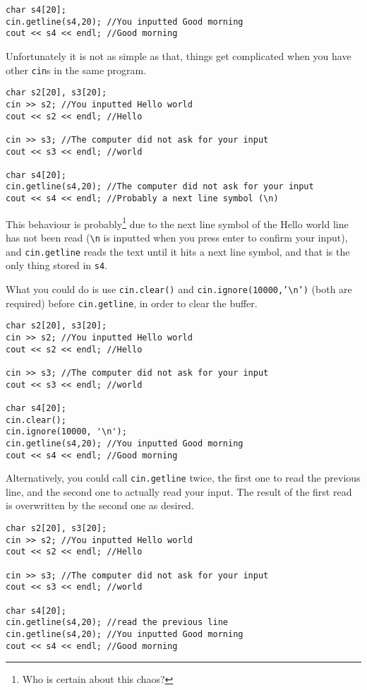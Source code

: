 \begin{lstlisting}
char s4[20];
cin.getline(s4,20); //You inputted Good morning
cout << s4 << endl; //Good morning
\end{lstlisting}

Unfortunately it is not as simple as that, things get complicated when you have other \texttt{cin}s in the same program.

\begin{lstlisting}
char s2[20], s3[20];
cin >> s2; //You inputted Hello world
cout << s2 << endl; //Hello

cin >> s3; //The computer did not ask for your input
cout << s3 << endl; //world

char s4[20];
cin.getline(s4,20); //The computer did not ask for your input
cout << s4 << endl; //Probably a next line symbol (\n)
\end{lstlisting}

This behaviour is probably\footnote{Who is certain about this chaos?} due to the next line symbol of the Hello world line has not been read (\texttt{\textbackslash n} is inputted when you press enter to confirm your input), and \texttt{cin.getline} reads the text until it hits a next line symbol, and that is the only thing stored in \texttt{s4}.

What you could do is use \texttt{cin.clear()} and \texttt{cin.ignore(10000,'\textbackslash n')} (both are required) before \texttt{cin.getline}, in order to clear the buffer.

\begin{lstlisting}
char s2[20], s3[20];
cin >> s2; //You inputted Hello world
cout << s2 << endl; //Hello

cin >> s3; //The computer did not ask for your input
cout << s3 << endl; //world

char s4[20];
cin.clear();
cin.ignore(10000, '\n');
cin.getline(s4,20); //You inputted Good morning
cout << s4 << endl; //Good morning
\end{lstlisting}

Alternatively, you could call \texttt{cin.getline} twice, the first one to read the previous line, and the second one to actually read your input. The result of the first read is overwritten by the second one as desired.

\begin{lstlisting}
char s2[20], s3[20];
cin >> s2; //You inputted Hello world
cout << s2 << endl; //Hello

cin >> s3; //The computer did not ask for your input
cout << s3 << endl; //world

char s4[20];
cin.getline(s4,20); //read the previous line
cin.getline(s4,20); //You inputted Good morning
cout << s4 << endl; //Good morning
\end{lstlisting}

